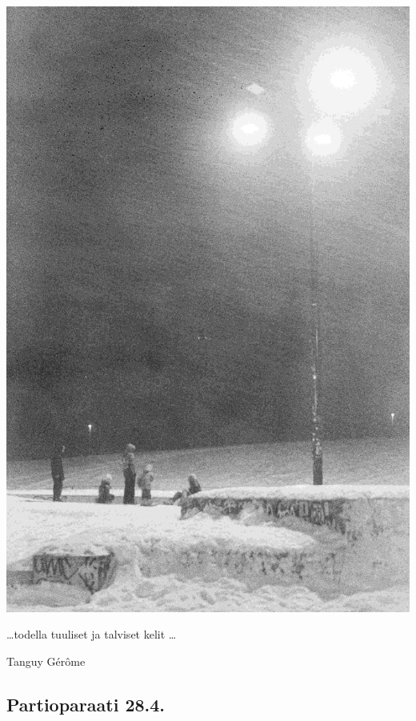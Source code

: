 \documentclass[10pt,finnish,a5paper,twoside=semi]{scrartcl}
\begin{document}
\begin{multicols}{2}
	\vspace*{1.28cm}
	\noindent\includegraphics[width=\linewidth]{assets/laskiaistiistai4}

	\ldots todella tuuliset ja talviset kelit \ldots

	\vfill
	\medskip
	\noindent\null\hfill Tanguy Gérôme

\end{multicols}






\clearpage
\subsection{Partioparaati 28.4.}
\end{document}
